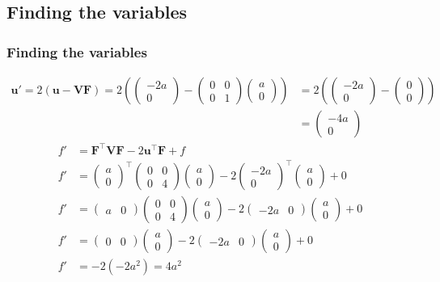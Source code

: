 \documentclass{beamer}
\providecommand{\brak}[1]{\ensuremath{\left(#1\right)}}
\theoremstyle{remark}
\newcommand{\myvec}[1]{\ensuremath{\begin{pmatrix}#1\end{pmatrix}}}
\let\vec\mathbf
\numberwithin{equation}{section}
\begin{document}
 \subsection{Finding the variables}
\begin{frame}
\frametitle{Finding the variables}
\begin{align}
  \vec{u'}=2\brak{\vec{u}-\vec{V}\vec{F}}=2\brak{\myvec{-2a\\0}-\myvec{0&0\\0&1}\myvec{a\\0}}&=2\brak{\myvec{-2a\\0}-\myvec{0\\0}}   \nonumber \\
  &=\myvec{-4a\\0}
  \end{align}
  \begin{align}
  f'&=\vec{F}^\top\vec{V}\vec{F}-2\vec{u}^\top\vec{F}+f \\
  f'&=\myvec{a\\0}^\top\myvec{0&0\\0&4}\myvec{a\\0}-2\myvec{-2a\\0}^\top\myvec{a\\0}+0\\
  f'&=\myvec{a&0}\myvec{0&0\\0&4}\myvec{a\\0}-2\myvec{-2a&0}\myvec{a\\0}+0\\
  f'&=\myvec{0&0}\myvec{a\\0}-2\myvec{-2a&0}\myvec{a\\0}+0\\
  f'&=-2\brak{-2a^2}=4a^2
 \end{align}
 
\end{frame}
\end{document}
